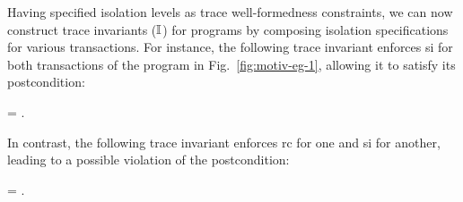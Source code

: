 Having specified isolation levels as trace well-formedness
constraints, we can now construct trace invariants ($\mathbb{I}$) for \txnimp
programs by composing isolation specifications for various
transactions. For instance, the following trace invariant enforces {\sc si}
for both transactions of the program in Fig.~\ref{fig:motiv-eg-1},
allowing it to satisfy its postcondition:
\begin{smathpar}
\I \;=\; \lambda\E.~  \conj {}
\end{smathpar}
In contrast, the following trace invariant enforces {\sc rc} for one and {\sc si}
for another, leading to a possible violation of the postcondition:
\begin{smathpar}
\I \;=\; \lambda\E.~  \conj {}
\end{smathpar}
